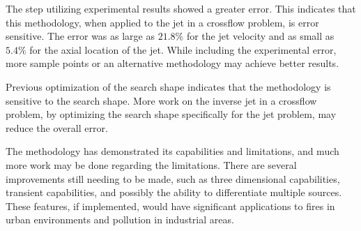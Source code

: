 \documentclass[preprint,12pt]{elsarticle}
\begin{document}
The step utilizing experimental results showed a greater error.  This indicates that this methodology, when applied to the jet in a crossflow problem, is error sensitive.  The error was as large as $21.8\%$ for the jet velocity and as small as $5.4\%$ for the axial location of the jet.  While including the experimental error, more sample points or an alternative methodology may achieve better results.

Previous optimization of the search shape indicates that the methodology is sensitive to the search shape\cite{ijhmt2}.  More work on the inverse jet in a crossflow problem, by optimizing the search shape specifically for the jet problem, may reduce the overall error.

The methodology has demonstrated its capabilities and limitations, and much more work may be done regarding the limitations.  There are several improvements still needing to be made, such as three dimensional capabilities, transient capabilities, and possibly the ability to differentiate multiple sources.  These features, if implemented, would have significant applications to fires in urban environments and pollution in industrial areas.
\appendix

{}

\end{document}
